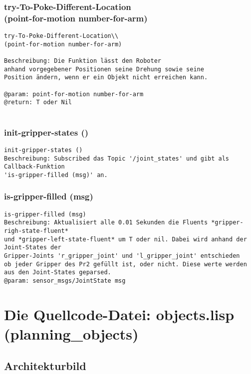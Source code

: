 \documentclass{suturo}
\begin{document}
\subsubsection{try-To-Poke-Different-Location\\
(point-for-motion number-for-arm)}
\begin{verbatim}
try-To-Poke-Different-Location\\
(point-for-motion number-for-arm)

Beschreibung: Die Funktion lässt den Roboter 
anhand vorgegebener Positionen seine Drehung sowie seine
Position ändern, wenn er ein Objekt nicht erreichen kann.

@param: point-for-motion number-for-arm
@return: T oder Nil


\end{verbatim}


\subsubsection{init-gripper-states ()}
\begin{verbatim}
init-gripper-states ()
Beschreibung: Subscribed das Topic '/joint_states' und gibt als Callback-Funktion
'is-gripper-filled (msg)' an.
\end{verbatim}

\subsubsection{is-gripper-filled (msg)}
\begin{verbatim}
is-gripper-filled (msg)
Beschreibung: Aktualisiert alle 0.01 Sekunden die Fluents *gripper-righ-state-fluent* 
und *gripper-left-state-fluent* um T oder nil. Dabei wird anhand der Joint-States der
Gripper-Joints 'r_gripper_joint' und 'l_gripper_joint' entschieden
ob jeder Gripper des Pr2 gefüllt ist, oder nicht. Diese werte werden
aus den Joint-States geparsed.
@param: sensor_msgs/JointState msg 
\end{verbatim}



\section{Die Quellcode-Datei: objects.lisp (planning\_objects)}
\subsection{Architekturbild}
\end{document}
